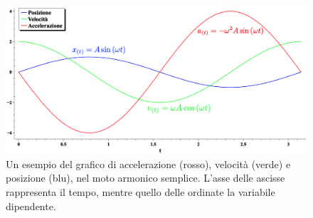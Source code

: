 \begin{figure}[htbp]
    \begin{center}
        \includegraphics[width=13cm]{images/Motoarm1.png} 
        \caption{Un esempio del grafico di accelerazione (rosso), velocità
        (verde) e posizione (blu), nel moto armonico semplice.
        L'asse delle ascisse rappresenta il tempo, mentre quello
        delle ordinate la variabile dipendente.}
    \end{center}
\label{fig:MA}
\end{figure}